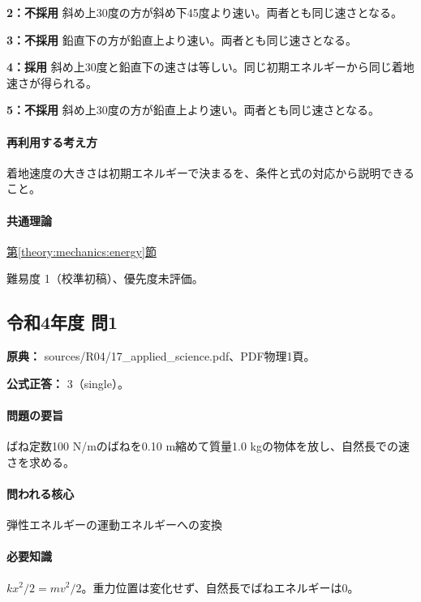 \noindent\textbf{2：不採用} 斜め上30度の方が斜め下45度より速い。両者とも同じ速さとなる。\par

\noindent\textbf{3：不採用} 鉛直下の方が鉛直上より速い。両者とも同じ速さとなる。\par

\noindent\textbf{4：採用} 斜め上30度と鉛直下の速さは等しい。同じ初期エネルギーから同じ着地速さが得られる。\par

\noindent\textbf{5：不採用} 斜め上30度の方が鉛直上より速い。両者とも同じ速さとなる。\par

\paragraph{再利用する考え方} 着地速度の大きさは初期エネルギーで決まるを、条件と式の対応から説明できること。

\paragraph{共通理論} \hyperref[theory:mechanics:energy]{第\ref*{theory:mechanics:energy}節}

\par 難易度 1（校準初稿）、優先度未評価。

\subsection{令和4年度 問1}
\label{q:r04-reg-applied-01}

\noindent\textbf{原典：} sources/R04/17\_applied\_science.pdf、PDF物理1頁。

\textbf{公式正答：} 3（single）。

\paragraph{問題の要旨} ばね定数100 N/mのばねを0.10 m縮めて質量1.0 kgの物体を放し、自然長での速さを求める。

\paragraph{問われる核心} 弾性エネルギーの運動エネルギーへの変換

\paragraph{必要知識} \(kx^2/2=mv^2/2\)。重力位置は変化せず、自然長でばねエネルギーは0。

